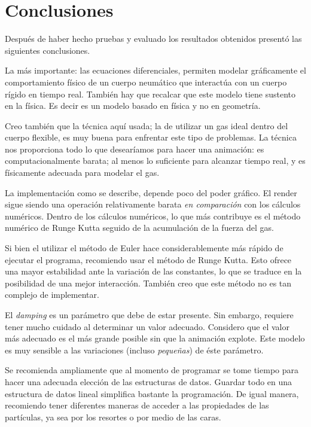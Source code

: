 \chapter*{Conclusiones}

Después de haber hecho pruebas y evaluado los resultados obtenidos presentó las siguientes conclusiones.

La más importante: las ecuaciones diferenciales, permiten modelar gráficamente el comportamiento físico de un cuerpo neumático que interactúa con un cuerpo rígido en tiempo real.
También hay que recalcar que este modelo tiene sustento en la física.
Es decir es un modelo basado en física y no en geometría.

Creo también que la técnica aquí usada; la de utilizar un gas ideal dentro del cuerpo flexible, es muy buena para enfrentar este tipo de problemas.
La técnica nos proporciona todo lo que desearíamos para hacer una animación: es computacionalmente barata; al menos lo suficiente para alcanzar tiempo real, y es físicamente adecuada para modelar el gas.

La implementación como se describe, depende poco del poder gráfico.
El render sigue siendo una operación relativamente barata \emph{en comparación} con los cálculos numéricos.
Dentro de los cálculos numéricos, lo que más contribuye es el método numérico de Runge Kutta seguido de la acumulación de la fuerza del gas.

Si bien el utilizar el método de Euler hace considerablemente más rápido de ejecutar el programa, recomiendo usar el método de Runge Kutta.
Esto ofrece una mayor estabilidad ante la variación de las constantes, lo que se traduce en la posibilidad de una mejor interacción.
También creo que este método no es tan complejo de implementar.

El \emph{\textenglish{damping}} es un parámetro que debe de estar presente.
Sin embargo, requiere tener mucho cuidado al determinar un valor adecuado.
Considero que el valor más adecuado es el más grande posible sin que la animación explote.
Este modelo es muy sensible a las variaciones (incluso \emph{pequeñas}) de éste parámetro.

Se recomienda ampliamente que al momento de programar se tome tiempo para hacer una adecuada elección de las estructuras de datos.
Guardar todo en una estructura de datos lineal simplifica bastante la programación.
De igual manera, recomiendo tener diferentes maneras de acceder a las propiedades de las partículas, ya sea por los resortes o por medio de las caras.

